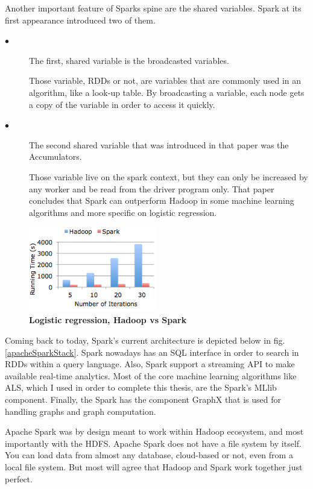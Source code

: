 Another important feature of Sparks spine are the shared variables. Spark at its first appearance introduced two of them. 
\begin{description}
	\item[$\bullet$] The first, shared variable is the broadcasted variables. 
	
	Those variable, RDDs or not, are variables that are commonly used in an algorithm, like a look-up table. By broadcasting a variable, each node gets a copy of the variable in order to access it quickly. 
	
	\item[$\bullet$] The second shared variable that was introduced in that paper was the Accumulators. 
	
	Those variable live on the spark context, but they can only be increased by any worker and be read from the driver program only. That paper concludes that Spark can outperform Hadoop in some machine learning algorithms and more specific on logistic regression.
\end{description}

\begin{figure}[ht]
	\centering
	\includegraphics[width=0.5\textwidth]{../images/hadoopVsSpark.png}
	\caption{\bfseries Logistic regression, Hadoop vs Spark \cite{HadoopVsSpark}}
	\label{hadoopVsSpark}
\end{figure}

Coming back to today, Spark's current architecture is depicted below in fig. \ref{apacheSparkStack}. Spark nowadays has an SQL interface in order to search in RDDs within a query language. Also, Spark support a streaming API to make available real-time analytics. Most of the core machine learning algorithms like ALS, which I used in order to complete this thesis, are the Spark's MLlib component. Finally, the Spark has the component GraphX that is used for handling graphs and graph computation.

Apache Spark was by design meant to work within Hadoop ecosystem, and most importantly with the HDFS. Apache Spark does not have a file system by itself. You can load data from almost any database, cloud-based or not, even from a local file system. But most will agree that Hadoop and Spark work together just perfect. \\

